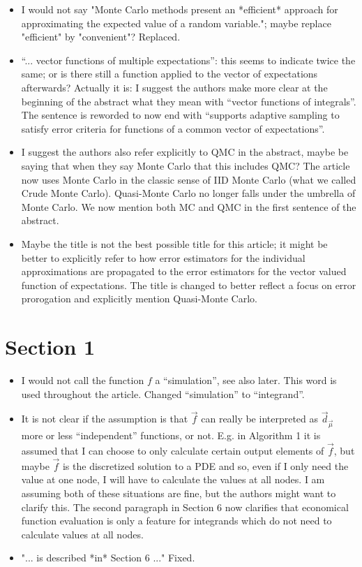 \documentclass{article}[12pt]
\newcommand{\Referee}[1]{{\color{blue} #1 \newline}}
\begin{document}
\begin{itemize}
    \item \Referee{I would not say "Monte Carlo methods present an *efficient* approach for approximating the expected value of a random variable."; maybe replace "efficient" by "convenient"?}Replaced.
    \item \Referee{``... vector functions of multiple expectations'': this seems to indicate twice the same; or is there still a function applied to the vector of expectations afterwards? Actually it is: I suggest the authors make more clear at the beginning of the abstract what they mean with ``vector functions of integrals''.}The sentence is reworded to now end with ``supports adaptive sampling to satisfy error criteria for functions of a common vector of expectations''.
    \item \Referee{I suggest the authors also refer explicitly to QMC in the abstract, maybe be saying that when they say Monte Carlo that this includes QMC?}The article  now uses Monte Carlo in the classic sense of IID Monte Carlo (what we called Crude Monte Carlo). Quasi-Monte Carlo no longer falls under the umbrella of Monte Carlo.  We now mention both MC and QMC in the first sentence of the abstract. 
    \item \Referee{Maybe the title is not the best possible title for this article; it might be better to explicitly refer to how error estimators for the individual approximations are propagated to the error estimators for the vector valued function of expectations.}The title is changed to better reflect a focus on error prorogation and explicitly mention Quasi-Monte Carlo. 
\end{itemize}

\section*{Section 1}

\begin{itemize}
    \item \Referee{I would not call the function $f$ a ``simulation'', see also later. This word is used throughout the article.}Changed ``simulation'' to ``integrand''.
    \item \Referee{It is not clear if the assumption is that $\vec{f}$ can really be interpreted as $\vec{d}_{\vec{\mu}}$ more or less ``independent'' functions, or not. E.g. in Algorithm 1 it is assumed that I can choose to only calculate certain output elements of $\vec{f}$, but maybe $\vec{f}$ is the discretized solution to a PDE and so, even if I only need the value at one node, I will have to calculate the values at all nodes. I am assuming both of these situations are fine, but the authors might want to clarify this.}The second paragraph in Section 6 now clarifies that economical function evaluation is only a feature for integrands which do not need to calculate values at all nodes. 
    \item \Referee{"... is described *in* Section 6 ..."}Fixed. 
\end{itemize}
\end{document}
